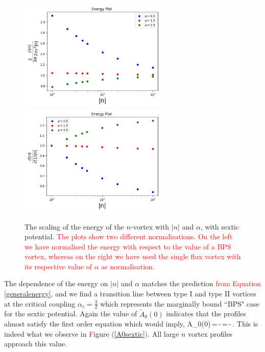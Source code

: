  \begin{figure}[H]
\begin{center}
 \includegraphics[width=2.8in]{Chapter_2_Folder_1912.11321/figures/sixth_order_alpha.pdf}\hspace{0.1in}\includegraphics[width=2.8in]{Chapter_2_Folder_1912.11321/figures/sixth_order_alpha_byE1.pdf}
     \caption[This figure shows the scaling of the energy of the $n$-vortex with $|n|$ and $\alpha$, with sextic potential.]{{ \small The scaling of the energy of the $n$-vortex with $|n|$ and $\alpha$, with sextic potential. \textcolor{red}{The plots show two different normalisations. On the left we have normalised the energy with respect to the value of a BPS vortex, whereas on the right we have used the single flux vortex with its respective value of $\alpha$ as normalisation.}}} \label{sexticenergy}
    \end{center}
\end{figure}
The dependence of the energy on $|n|$ and $\alpha$ matches the prediction \textcolor{red}{from Equation} \eqref{generalenergy}, and we find a transition line between type I and type II vortices at the critical coupling $\alpha_c = \tfrac32$ which represents the marginally bound ``BPS" case for the sextic potential.   Again the value of $\tilde A_0(0)$ indicates that the profiles almost satisfy the first order equation which would imply,
\be
\tilde A_0(0)\,=\,-\,=\,-\,.
\ee
This is indeed what we observe in \textcolor{red}{F}igure \textcolor{red}{(}\ref{A0sextic}\textcolor{red}{)}. All large $n$ vortex profiles approach this value\textcolor{red}{.}
